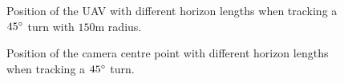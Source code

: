 \begin{figure}
	\centering
	\caption{Position of the UAV with different horizon lengths when tracking a $45\degree$ turn with $150$m radius.}
	\label{fig:cur_45deg_150m_uav_position}
\end{figure}


\begin{figure}
	\centering
	\caption{Position of the camera centre point with different horizon lengths when tracking a $45\degree$ turn.}
	\label{fig:lin_45deg_camera_position}
\end{figure}

